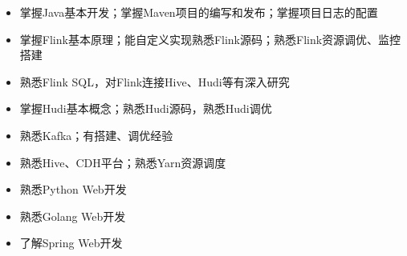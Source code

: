   \begin{itemize}[leftmargin=*]
    \item 掌握Java基本开发；掌握Maven项目的编写和发布；掌握项目日志的配置
    \item 掌握Flink基本原理；能自定义实现熟悉Flink源码；熟悉Flink资源调优、监控搭建
    \item 熟悉Flink SQL，对Flink连接Hive、Hudi等有深入研究
    \item 掌握Hudi基本概念；熟悉Hudi源码，熟悉Hudi调优
    \item 熟悉Kafka；有搭建、调优经验
    \item 熟悉Hive、CDH平台；熟悉Yarn资源调度
    \item 熟悉Python Web开发
    \item 熟悉Golang Web开发
    \item 了解Spring Web开发
  \end{itemize}